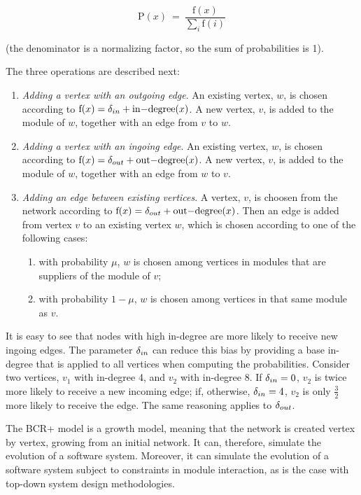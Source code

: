 $$
  \mathrm{P}(x) ~=~ \frac{ \mathrm{f}(x) }
  { \displaystyle\sum_{i} \mathrm{f}(i) }
$$

(the denominator is a normalizing factor, so the sum of probabilities is 1).

The three operations are described next:

\begin{enumerate}

\item \emph{Adding a vertex with an outgoing edge}. An existing vertex, $w$, is
chosen according to $\mathrm{f}(x) = \delta_{in} + \mathrm{in\relax{-}degree}(x)$. A new
vertex, $v$, is added to the module of $w$, together with an edge from $v$ to
$w$.

\item \emph{Adding a vertex with an ingoing edge}. An existing vertex, $w$, is
chosen according to $\mathrm{f}(x) = \delta_{out} + \mathrm{out\relax{-}degree}(x)$. A
new vertex, $v$, is added to the module of $w$, together with an edge from $w$
to $v$.

\item \emph{Adding an edge between existing vertices}. A vertex, $v$, is choosen
from the network according to $\mathrm{f}(x) = \delta_{out} +
\mathrm{out\relax{-}degree}(x)$.  Then an edge is added from vertex $v$ to an
existing vertex $w$, which is chosen according to one of the following cases:

\begin{enumerate}
  \item with probability $\mu$, $w$ is chosen among vertices in modules that are
  suppliers of the module of $v$;
  \item with probability $1 - \mu$, $w$ is chosen among vertices in that same
  module as $v$.
\end{enumerate}

\end{enumerate}

It is easy to see that nodes with high in-degree are more likely to receive new
ingoing edges. The parameter $\delta_{in}$ can reduce this bias by providing a base
in-degree that is applied to all vertices when computing the probabilities.
Consider two vertices, $v_1$ with in-degree 4, and $v_2$ with in-degree 8. If
$\delta_{in} = 0$, $v_2$ is twice more likely to receive a new incoming edge; if,
otherwise, $\delta_{in} = 4$, $v_2$ is only $\frac{3}{2}$ more likely to receive the
edge. The same reasoning applies to $\delta_{out}$.

The BCR+ model is a growth model, meaning that the network is created vertex by
vertex, growing from an initial network. It can, therefore, simulate the
evolution of a software system. Moreover, it can simulate the evolution of a
software system subject to constraints in module interaction, as is the case
with top-down system design methodologies.

